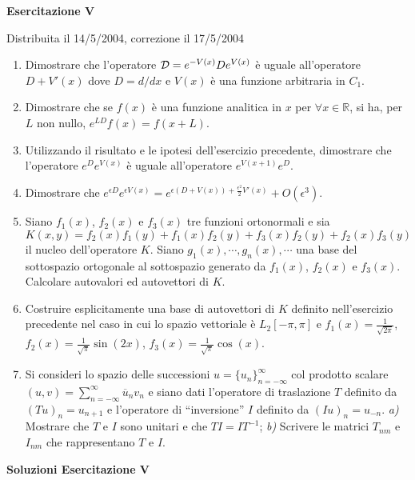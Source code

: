 \documentclass[a4paper,10pt]{article}
\begin{document}
\newpage


\centerline{\LARGE \bf Esercitazione V}
\centerline{Distribuita il 14/5/2004, correzione il 17/5/2004}
\vskip10pt

\begin{enumerate}
\item Dimostrare che l'operatore ${\cal D} =e^{-V(x)} D e^{V(x)}$ \`e uguale all'operatore $D + V'(x)$ dove $D=d/dx$ e $V(x)$ \`e una funzione arbitraria in $C_1$.
\item Dimostrare che se $f(x)$ \`e una funzione analitica in $x$ 
per $\forall x \in \mathbb{R}$, si ha, per $L$ non nullo, $e^{L D} f(x) = f(x+L)$.
\item Utilizzando il risultato e le ipotesi dell'esercizio precedente, dimostrare che l'operatore $e^D e^{V(x)}$ \`e uguale all'operatore $e^{V(x+1)} e^D$.
\item Dimostrare che $e^{\epsilon D}e^{\epsilon V(x)} = 
e^{\epsilon (D + V(x)) + \frac{\epsilon^2}{2} V'(x)} + O(\epsilon^3)$.
\item Siano $f_1(x)$, $f_2(x)$ e $f_3(x)$ tre funzioni ortonormali e
sia $K(x,y) = f_2(x) f_1(y) + f_1(x) f_2(y) + f_3(x) f_2(y) + f_2(x) f_3(y)$
il nucleo dell'operatore $K$.
Siano $g_1(x),\cdots,g_n(x),\cdots$ una base del sottospazio ortogonale
al sottospazio generato da $f_1(x)$, $f_2(x)$ e $f_3(x)$.
Calcolare autovalori ed autovettori di $K$.
\item Costruire esplicitamente una base di autovettori di $K$ definito
nell'esercizio precedente nel caso in cui lo spazio vettoriale 
\`e $L_2[-\pi,\pi]$ e $f_1(x) =\frac{1}{\sqrt{2\pi}}$, $f_2(x)= \frac{1}{\sqrt{\pi}} \sin(2x)$,
$f_3(x)= \frac{1}{\sqrt{\pi}} \cos(x)$.
\item Si consideri lo spazio delle successioni
$u = \{ u_n \}_{n=-\infty}^\infty$
col prodotto scalare $(u,v)=\sum_{n=-\infty}^{\infty} \overline{u}_n v_n$ e
siano dati l'operatore di traslazione $T$ definito da $(T u)_n = u_{n+1}$
e l'operatore di ``inversione'' $I$ definito da $(I u)_n = u_{-n}$.
{\it a)} Mostrare che $T$ e $I$ sono unitari e che $T I = I T^{-1}$; 
{\it b)} Scrivere le matrici $T_{nm}$ e $I_{nm}$ che rappresentano $T$
e $I$.
\end{enumerate}

\newpage

\centerline{\LARGE \bf Soluzioni Esercitazione V}
\vskip10pt
\end{document}
